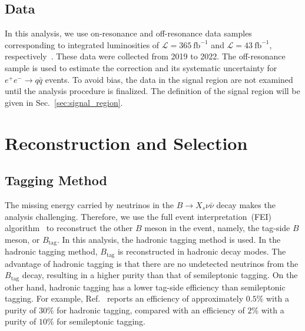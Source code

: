 \section{Data}
In this analysis, we use on-resonance and off-resonance data samples corresponding to integrated luminosities of $\mathcal{L}=365~\textrm{fb}^{-1}$ and $\mathcal{L}=43~\textrm{fb}^{-1}$, respectively~\cite{Belle-II:2024vuc}.
These data were collected from 2019 to 2022.
The off-resonance sample is used to estimate the correction and its systematic uncertainty for $e^{+}e^{-}\rightarrow q\bar{q}$ events.
To avoid bias, the data in the signal region are not examined until the analysis procedure is finalized.
The definition of the signal region will be given in Sec.~\ref{sec:signal_region}.

\chapter{Reconstruction and Selection}
\label{chap:rec_and_selec}

\section{Tagging Method}
The missing energy carried by neutrinos in the $B \rightarrow X_{s} \nu \bar{\nu}$ decay makes the analysis challenging.
Therefore, we use the full event interpretation~(FEI) algorithm~\cite{Keck:2018lcd} to reconstruct the other $B$ meson in the event, namely, the tag-side $B$ meson, or $B_{\textrm{tag}}$.
In this analysis, the hadronic tagging method is used.
In the hadronic tagging method, $B_{\textrm{tag}}$ is reconstructed in hadronic decay modes.
The advantage of hadronic tagging is that there are no undetected neutrinos from the $B_{\textrm{tag}}$ decay, resulting in a higher purity than that of semileptonic tagging.
On the other hand, hadronic tagging has a lower tag-side efficiency than semileptonic tagging.
For example, Ref.~\cite{Bertacchi:2023kdm} reports an efficiency of approximately $0.5\%$ with a purity of $30\%$ for hadronic tagging, compared with an efficiency of $2\%$ with a purity of $10\%$ for semileptonic tagging.

